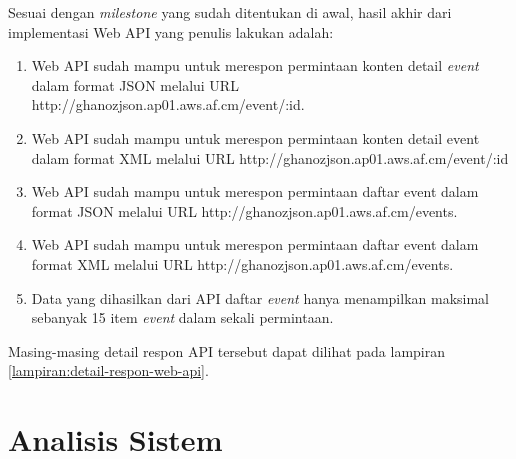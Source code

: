 \documentclass[a4paper, 12pt, oneside]{report}
\begin{document}
\onehalfspacing Sesuai dengan \textit{milestone} yang sudah ditentukan di awal, hasil akhir dari implementasi Web API yang penulis lakukan adalah:

\begin{enumerate}
  \item Web API sudah mampu untuk merespon permintaan konten detail \textit{event} dalam format JSON melalui URL http://ghanozjson.ap01.aws.af.cm/event/:id.
  \item Web API sudah mampu untuk merespon permintaan konten detail event dalam format XML melalui URL http://ghanozjson.ap01.aws.af.cm/event/:id
  \item Web API sudah mampu untuk merespon permintaan daftar event dalam format JSON melalui URL http://ghanozjson.ap01.aws.af.cm/events.
  \item Web API sudah mampu untuk merespon permintaan daftar event dalam format XML melalui URL http://ghanozjson.ap01.aws.af.cm/events.
  \item Data yang dihasilkan dari API daftar \textit{event} hanya menampilkan maksimal sebanyak 15 item \textit{event} dalam sekali permintaan.
\end{enumerate}

\onehalfspacing Masing-masing detail respon API tersebut dapat dilihat pada lampiran \ref{lampiran:detail-respon-web-api}.

\chapter{Analisis Sistem} \label{bab:3}
\end{document}
